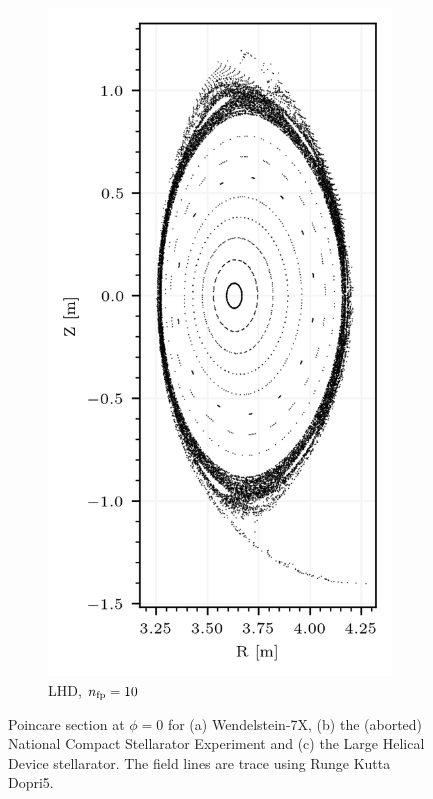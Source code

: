 \begin{figure}[H]
\begin{subfigure}{0.32\textwidth}
        \includegraphics[width=\textwidth]{images/theory/lhd.png}
        \caption{LHD, $n_\text{fp} = 10$}
        \label{fig:enter-label}
    \end{subfigure}

    \caption{Poincare section at $\phi = 0$ for (a) Wendelstein-7X, (b) the (aborted) National Compact Stellarator Experiment and (c) the Large Helical Device stellarator. The field lines are trace using Runge Kutta Dopri5.}\label{fig:poincare-example}
    \label{fig:enter-label}
\end{figure}

